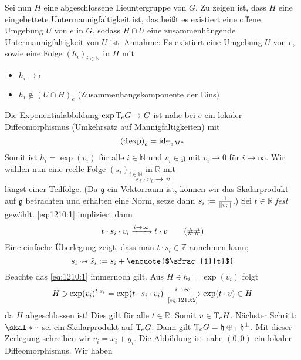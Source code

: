 \begin{beweis}
\begin{enumerate}[1)]
		Sei nun $H$ eine abgeschlossene Lieuntergruppe von $G$.
		Zu zeigen ist, dass $H$ eine eingebettete Untermannigfaltigkeit ist, das heißt es existiert eine offene Umgebung $U$ von $e$ in $G$, sodass $H \cap U$ eine zusammenhängende Untermannigfaltigkeit von $U$ ist. 
		Annahme: Es existiert eine Umgebung $U$ von $e$, sowie eine Folge $(h_i)_{i \in \mathbb{N}}$ in $H$ mit
		\begin{itemize}
			\item $h_i \to e$
			\item $h_i \notin (U \cap H)_e$ (Zusammenhangskomponente der Eins)
		\end{itemize}
		Die Exponentialabbildung $\exp \Tmap_e G \to G$ ist nahe bei $e$ ein lokaler Diffeomorphismus (Umkehrsatz auf Mannigfaltigkeiten) mit 
		\[
			\enbrace*{\mathd \exp}_e = \id_{\Tmap_p M^n}
		\]
		Somit ist $h_i = \exp(v_i)$ für alle $i \in \mathbb{N}$ und $v_i \in \mathfrak{g}$ mit $v_i \to 0$ für $i \to \infty$.
		Wir wählen nun eine reelle Folge $(s_i)_{i \in \mathbb{N}}$ in $\mathbb{R}$ mit 
		\begin{equation}
			s_i \cdot v_i \to v \label{eq:1210:1} \tag{\#}
		\end{equation}
		längst einer Teilfolge.
		(Da $\mathfrak{g}$ ein Vektorraum ist, können wir das Skalarprodukt auf $\mathfrak{g}$ betrachten und erhalten eine Norm, setze dann $s_i := \frac{1}{\norm*{v_i}} $.)
		Sei $t \in \mathbb{R}$ \emph{fest} gewählt.
		\eqref{eq:1210:1} impliziert dann
		\begin{equation}
			t \cdot s_i \cdot v_i \grenzw{i \to \infty} t \cdot v \label{eq:1210:2} \tag{\#\#}
		\end{equation}
		Eine einfache Überlegung zeigt, dass man $t \cdot s_i \in \mathbb{Z}$ annehmen kann; 
		\[
			s_i \leadsto \tilde{s}_i := s_i + \text{\enquote{$\sfrac{1}{t}$}} 
		\]
		Beachte das \eqref{eq:1210:1} immernoch gilt.
		Aus $H \ni h_i = \exp(v_i)$ folgt 
		\[
			H \ni \exp(v_i)^{t \cdot s_i} = \exp \enbrace*{t \cdot s_i \cdot v_i} \xrightarrow[\text{\eqref{eq:1210:2}}]{i \to \infty} \exp(t \cdot v) \in H
		\]
		da $H$ abgeschlossen ist!
		Dies gilt für alle $t \in \mathbb{R}$.
		Somit $v \in \Tmap_e H$.
		Nächster Schritt: $\skal*{\cdot }{\cdot }$ sei ein Skalarprodukt auf $\Tmap_e G$.
		Dann gilt $\Tmap_e G = \mathfrak{h} \oplus_{\bot} \mathfrak{h}^{\bot}$.
		Mit dieser Zerlegung schreiben wir $v_i =x_i + y_i$.
		Die Abbildung 
		ist nahe $(0,0)$ ein lokaler Diffeomorphismus.
		Wir haben

\end{enumerate}
\end{beweis}
